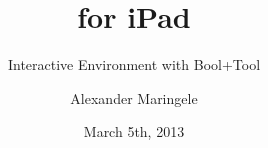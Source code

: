%

\usebackgroundtemplate{ %
\vbox to \paperheight{\vspace{2.3cm}\hbox to \paperwidth{\hfil\texttt{[image: pics/NyayaAppIcon1024.png]}\hfil}}
}

\title{\Nyaya  for iPad}
\subtitle{Interactive Environment with Bool+Tool \vspace{1.8cm}}
\author{Alexander Maringele}
\institute[UIBK]{}

\date{March 5th, 2013}



